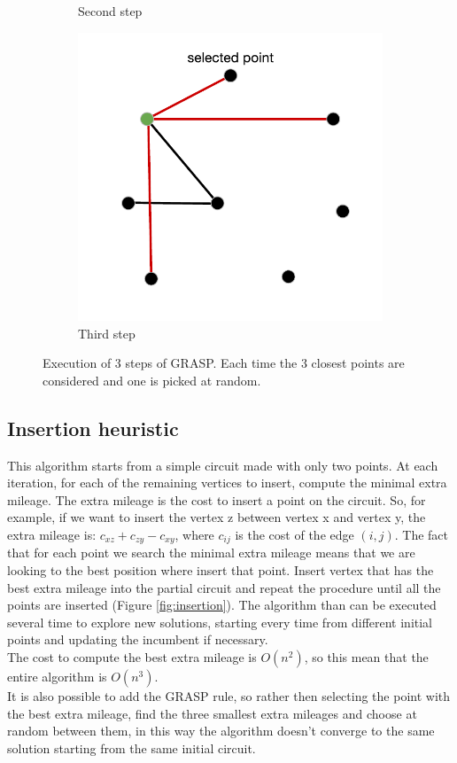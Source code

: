 \begin{figure}[h!]
\begin{subfigure}[b]{0.48\linewidth}
    \caption{Second step}
  \end{subfigure}
  \begin{subfigure}[b]{0.48\linewidth}
    \includegraphics[width=\linewidth]{media/grasp_fase3.pdf}
    \caption{Third step}
  \end{subfigure}
  \caption{Execution of 3 steps of GRASP. Each time the 3 closest points are considered and one is picked at random.}
\end{figure}

\subsection{Insertion heuristic}
\label{insertion}
This algorithm starts from a simple circuit made with only two points. At each iteration, for each of the remaining vertices to insert, compute the minimal extra mileage. The extra mileage is the cost to insert a point on the circuit. So, for example, if we want to insert the vertex z between vertex x and vertex y, the extra mileage is: $c_{xz} + c_{zy} - c_{xy}$, where $c_{ij}$ is the cost of the edge $(i, j)$. The fact that for each point we search the minimal extra mileage means that we are looking to the best position where insert that point. Insert vertex that has the best extra mileage into the partial circuit and repeat the procedure until all the points are inserted (Figure \ref{fig:insertion}). The algorithm than can be executed several time to explore new solutions, starting every time from different initial points and updating the incumbent if necessary. \\
The cost to compute the best extra mileage is $O(n^2)$, so this mean that the entire algorithm is $O(n^3)$.\\
It is also possible to add the GRASP rule, so rather then selecting the point with the best extra mileage, find the three smallest extra mileages and choose at random between them, in this way the algorithm doesn't converge to the same solution starting from the same initial circuit. \\

